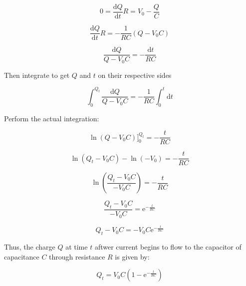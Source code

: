 \documentclass[a4paper,12pt]{article}
\begin{document}
						 \begin{equation*}
							0 =	\frac{\mathrm{d}Q}{\mathrm{d}t}R = V_{0} - \frac{Q}{C}
						 \end{equation*}

						 \begin{equation*}
								 \frac{\mathrm{d}Q}{\mathrm{d}t}R = -\frac{1}{RC} \left( Q - V_{0}C \right)
						 \end{equation*}

						\begin{equation*}
								\frac{\mathrm{d}Q}{Q - V_{0}C} = -\frac{\mathrm{d}t}{RC}
						\end{equation*}

						Then integrate to get $Q$ and $t$ on their respective sides

						\begin{equation*}
								\int_{0}^{Q_{t}} \frac{\mathrm{d}Q}{Q - V_{0}C} = -\frac{1}{RC} \int_{0}^{t} \mathrm{d}t
						\end{equation*}

						Perform the actual integration:

						\begin{equation*}
									\ln\left(Q - V_{0}C\right) \Big]_{0}^{Q_{t}} = -\frac{t}{RC}
						\end{equation*}

						\begin{equation*}
								\ln\left(Q_{t} - V_{0}C\right) - \ln\left(-V_{0}\right) = -\frac{t}{RC}
						\end{equation*}

						\begin{equation*}
								\ln\left(\frac{Q_{t} -V_{0}C}{-V_{0}C}\right) = -\frac{t}{RC}
						\end{equation*}
						
						\begin{equation*}
								\frac{Q_{t} -V_{0}C}{-V_{0}C} =\mathrm{e}^{-\frac{t}{RC}}
						\end{equation*}
						
						\begin{equation*}
								Q_{t} - V_{0}C = -V_{0}C\mathrm{e}^{-\frac{t}{RC}}
						\end{equation*}
						
						Thus, the charge $Q$ at time $t$ aftwer current begins to flow to the capacitor of capacitance $C$ through resistance $R$ is given by: 

						\begin{equation*}
								Q_{t} = V_{0}C\left(1-\mathrm{e}^{-\frac{t}{RC}}\right)
						\end{equation*}
\end{document}
